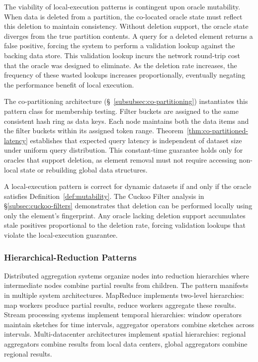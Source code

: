 The viability of local-execution patterns is contingent upon oracle mutability. When data is deleted from a partition, the co-located oracle state must reflect this deletion to maintain consistency. Without deletion support, the oracle state diverges from the true partition contents. A query for a deleted element returns a false positive, forcing the system to perform a validation lookup against the backing data store. This validation lookup incurs the network round-trip cost that the oracle was designed to eliminate. As the deletion rate increases, the frequency of these wasted lookups increases proportionally, eventually negating the performance benefit of local execution.

The co-partitioning architecture (\S~\ref{subsubsec:co-partitioning}) instantiates this pattern class for membership testing. Filter buckets are assigned to the same consistent hash ring as data keys. Each node maintains both the data items and the filter buckets within its assigned token range. Theorem~\ref{thm:co-partitioned-latency} establishes that expected query latency is independent of dataset size under uniform query distribution. This constant-time guarantee holds only for oracles that support deletion, as element removal must not require accessing non-local state or rebuilding global data structures.

A local-execution pattern is correct for dynamic datasets if and only if the oracle satisfies Definition~\ref{def:mutability}. The Cuckoo Filter analysis in \S\ref{subsec:cuckoo-filters} demonstrates that deletion can be performed locally using only the element's fingerprint. Any oracle lacking deletion support accumulates stale positives proportional to the deletion rate, forcing validation lookups that violate the local-execution guarantee.

\subsubsection{Hierarchical-Reduction Patterns}
\label{subsubsec:composability-hierarchy}

Distributed aggregation systems organize nodes into reduction hierarchies where intermediate nodes combine partial results from children. The pattern manifests in multiple system architectures. MapReduce implements two-level hierarchies: map workers produce partial results, reduce workers aggregate these results. Stream processing systems implement temporal hierarchies: window operators maintain sketches for time intervals, aggregator operators combine sketches across intervals. Multi-datacenter architectures implement spatial hierarchies: regional aggregators combine results from local data centers, global aggregators combine regional results.


